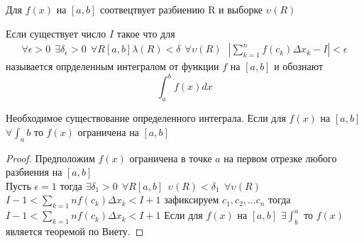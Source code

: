 Для $f(x)$ на $[a,b]$ соотвецтвует разбиению R и выборке $\upsilon(R)$\\

\begin{defin}
  Если существует число $I$ такое что для
  \begin{eqnarray*}
    \forall\epsilon>0 ~~ \exists\delta_{\epsilon}>0 ~~ \forall R[a,b]
    \lambda(R)<\delta ~~ \forall\upsilon(R) ~~~
    |\sum_{k=1}^{n} f(c_k)\Delta x_k - I| < \epsilon
  \end{eqnarray*}
  называется опрделенным интегралом от функции $f$ на $[a,b]$ и обознают
  $$\int_{a}^{b} f(x)dx$$
\end{defin}

\begin{theorem}
  Необходимое существование определенного интеграла. Если для $f(x)$ на $[a,b]$
  $\forall \int_{a}{b}$ то $f(x)$ ограничена на $[a,b]$
\end{theorem}

\begin{proof}
  Предположим $f(x)$ ограничена в точке $a$ на первом отрезке любого разбиения
  на $[a,b]$\\
  Пусть $\epsilon = 1$ тогда $\exists \delta_1 > 0 ~~ \forall R[a,b] ~~
  \upsilon(R) < \delta_1 ~~ \forall \upsilon(R)$
  $I-1 < \sum_{k=1}{n}f(c_k)\Delta x_k < I+1$ зафиксируем $c_1, c_2, \ldots c_n$
  тогда $I-1 < \sum_{k=1}{n}f(c_k)\Delta x_k < I+1$
  Если для $f(x)$ на $[a,b]$ $\exists \int_{b}^{a}$ то $f(x)$
  является теоремой по Виету.
\end{proof}